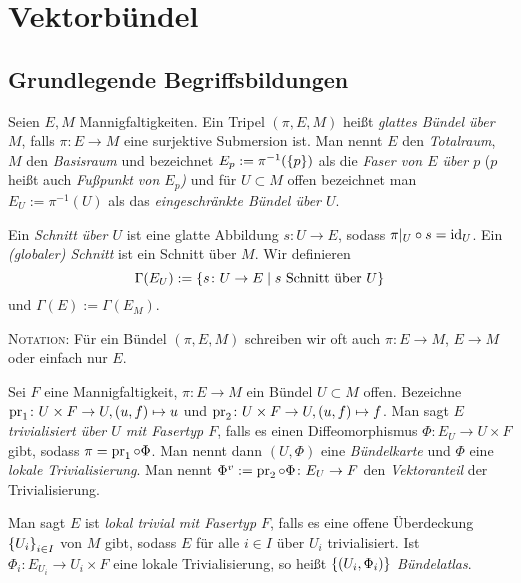 \section{Vektorbündel}
\label{sec:faserbl}


\subsection{Grundlegende Begriffsbildungen}

\begin{definition}
  Seien $E,M$ Mannigfaltigkeiten. Ein Tripel $(\pi,E,M)$ heißt
  \emph{glattes Bündel über $M$}, falls $\pi \colon E\to M$ eine
  surjektive Submersion ist. Man nennt $E$ den \emph{Totalraum}, $M$
  den \emph{Basisraum} und bezeichnet $E_p := \pi^{-1}(\left\lbrace p \right\rbrace)$ als
  die \emph{Faser von $E$ über $p$} ($p$ heißt auch \emph{Fußpunkt von
    $E_p$)} und für $U\subset M$ offen bezeichnet man $E_U :=
  \pi^{-1}(U)$ als das \emph{eingeschränkte Bündel über $U$}.

  Ein \emph{Schnitt über $U$} ist eine glatte Abbildung $s\colon U \to
  E$, sodass $\pi|_U\circ s = \operatorname{id}_U$. Ein \emph{(globaler) Schnitt}
  ist ein Schnitt über $M$. Wir definieren
  \begin{equation*}
    \Gamma(E_U) := \left\lbrace  s\colon U \to E \mid s\text{ Schnitt über } U  \right\rbrace
  \end{equation*}
  und $\Gamma(E) := \Gamma(E_M)$.

  \textsc{Notation:} Für ein Bündel $(\pi,E,M)$ schreiben wir oft auch
  $\pi\colon E\to M$, $E\to M$ oder einfach nur $E$.
\end{definition}

\begin{definition}
  Sei $F$ eine Mannigfaltigkeit, $\pi\colon E \to M$ ein Bündel
  $U\subset M$ offen. Bezeichne $\operatorname{pr}_1\colon U\times F \to U, (u,f)
  \mapsto u$ und $\operatorname{pr}_2\colon U\times F \to U, (u,f)
  \mapsto f$.
  Man sagt \emph{$E$ trivialisiert über $U$ mit Fasertyp $F$}, falls es
  einen Diffeomorphismus $\Phi \colon E_U \to U\times F$ gibt, sodass $\pi
  = \operatorname{pr}_1\circ \Phi$. Man nennt dann $(U,\Phi)$ eine
  \emph{Bündelkarte} und $\Phi$ eine \emph{lokale
    Trivialisierung}. Man nennt $\Phi^v := \operatorname{pr}_2\circ \Phi \colon E_U
  \to F$ den \emph{Vektoranteil} der Trivialisierung.

  Man sagt $E$ ist \emph{lokal trivial mit Fasertyp $F$}, falls es
  eine offene Überdeckung $\left\lbrace U_i \right\rbrace_{i\in I}$ von $M$ gibt, sodass
  $E$ für alle $i\in I$ über $U_i$ trivialisiert. Ist $\Phi_i \colon
  E_{U_i}\to U_i\times F$ eine lokale Trivialisierung, so heißt
  $\left\lbrace (U_i,\Phi_i) \right\rbrace$ \emph{Bündelatlas}. 
\end{definition}

